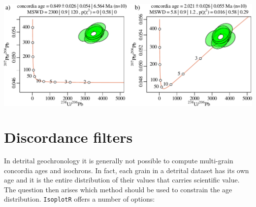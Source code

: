\begin{refsection}
\noindent\includegraphics[width=\linewidth]{../figures/diseq.pdf}
\begingroup
{}
\label{fig:diseq}
\endgroup

\section{Discordance filters}
\label{sec:discfilter}

In detrital geochronology it is generally not possible to compute
multi-grain concordia ages and isochrons. In fact, each grain in a
detrital dataset has its own age and it is the entire distribution of
their values that carries scientific value. The question then arises
which method should be used to constrain the age distribution.
\texttt{IsoplotR} offers a number of options:


\end{refsection}
